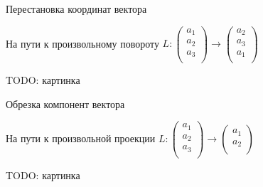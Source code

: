 \documentclass[14pt,xcolor=dvipsnames]{beamer}
\begin{document}
\begin{frame}{Перестановка координат вектора}

\begin{block}{На пути к произвольному повороту}
  $L : \begin{pmatrix}
    a_1 \\
    a_2 \\
    a_3 \\
  \end{pmatrix} \to 
  \begin{pmatrix}
    a_2 \\
    a_3 \\
    a_1 \\
  \end{pmatrix}$
\end{block}

\begin{block}{TODO: картинка}

\end{block}
    
\end{frame}




\begin{frame}{Обрезка компонент вектора}

\begin{block}{На пути к произвольной проекции}
  $L : \begin{pmatrix}
    a_1 \\
    a_2 \\
    a_3 \\
  \end{pmatrix} \to 
  \begin{pmatrix}
    a_1 \\
    a_2 \\
  \end{pmatrix}$
\end{block}

\begin{block}{TODO: картинка}

\end{block}
    
\end{frame}
\end{document}
